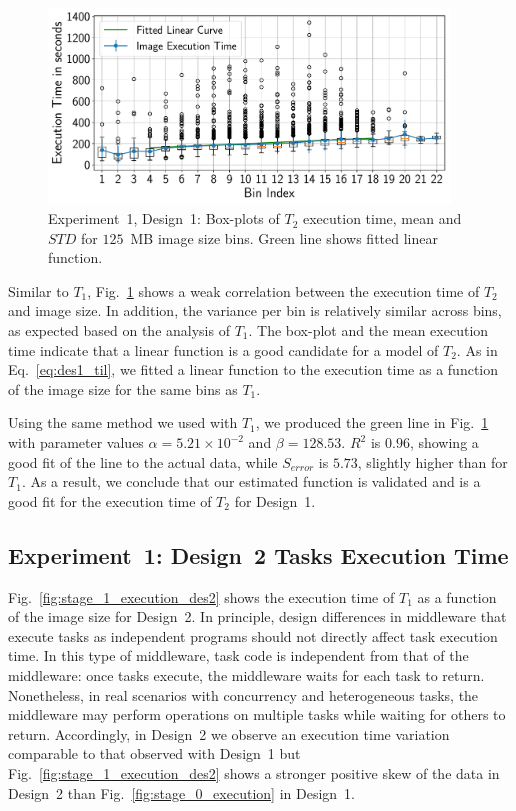 \begin{figure}[ht!]
    \centering
    \includegraphics[width=0.95\textwidth]{figures/designs/stage_1_tx_box.pdf}
    \caption{Experiment~1, Design~1: Box-plots of $T_{2}$ execution time, mean and $STD$ for $125$~MB image size bins.
        Green line shows fitted linear function.}
    \label{fig:stage_1_execution}
\end{figure}

Similar to $T_{1}$, Fig.~\ref{fig:stage_1_execution} shows a weak correlation between the execution time of $T_{2}$ and image size.
In addition, the variance per bin is relatively similar across bins, as expected based on the analysis of $T_{1}$.
The box-plot and the mean execution time indicate that a linear function is a good candidate for a model of $T_{2}$.
As in Eq.~\ref{eq:des1_til}, we fitted a linear function to the execution time as a function of the image size for the same bins as $T_{1}$.

Using the same method we used with $T_{1}$, we produced the green line in Fig.~\ref{fig:stage_1_execution} with parameter values $\alpha = 5.21 \times 10^{-2}$ and $\beta = 128.53$.
$R^{2}$ is $0.96$, showing a good fit of the line to the actual data, while $S_{error}$ is $5.73$, slightly higher than for $T_{1}$.
As a result, we conclude that our estimated function is validated and is a good fit for the execution time of $T_{2}$ for Design~1.

\subsection{Experiment~1: Design~2 Tasks Execution Time}

Fig.~\ref{fig:stage_1_execution_des2} shows the execution time of $T_{1}$ as a function of the image size for Design~2.
In principle, design differences in middleware that execute tasks as independent programs should not directly affect task execution time.
In this type of middleware, task code is independent from that of the middleware: once tasks execute, the middleware waits for each task to return.
Nonetheless, in real scenarios with concurrency and heterogeneous tasks, the middleware may perform operations on multiple tasks while waiting for others to return.
Accordingly, in Design~2 we observe an execution time variation comparable to that observed with Design~1 but Fig.~\ref{fig:stage_1_execution_des2} shows a stronger positive skew of the data in Design~2 than Fig.~\ref{fig:stage_0_execution} in Design~1.

